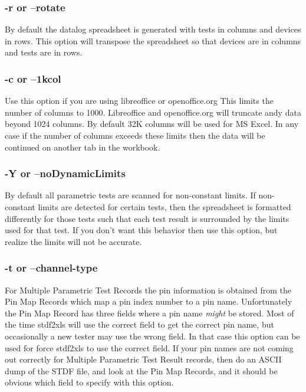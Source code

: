 \documentclass[letterpaper]{article}
\begin{document}
\subsubsection{\bf -r or --rotate}
By default the datalog spreadsheet is generated with tests in columns and devices in rows.  This
option will transpose the spreadsheet so that devices are in columns and tests are in rows.

\subsubsection{\bf -c or --1kcol}
Use this option if you are using libreoffice or openoffice.org  This limits the number
of columns to 1000.  Libreoffice and openoffice.org will truncate andy data beyond 1024 columns.
By default 32K columns will be used for MS Excel.  In any case if the number of columns
exceeds these limits then the data will be continued on another tab in the workbook.

\subsubsection{\bf -Y or --noDynamicLimits}
By default all parametric tests are scanned for non-constant limits.  If non-constant
limits are detected for certain tests, then the spreadsheet is formatted differently
for those tests such that each test result is surrounded by the limits used for that
test.  If you don't want this behavior then use this option, but realize the limits
will not be accurate.

\subsubsection{\bf -t or --channel-type}
For Multiple Parametric Test Records the pin information is obtained from
the Pin Map Records which map a pin index number to a pin name.  Unfortunately
the Pin Map Record has three fields where a pin name {\it might} be stored.
Most of the time stdf2xls will use the correct field to get the correct
pin name, but occasionally a new tester may use the wrong field.  In that
case this option can be used for force stdf2xls to use the correct field.
If your pin names are not coming out correctly for Multiple Parametric Test Result
records, then do an ASCII dump of the STDF file, and look at the Pin Map Records,
and it should be obvious which field to specify with this option.
\end{document}
